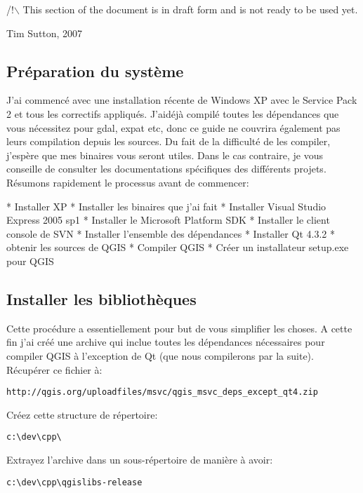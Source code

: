 /!$\backslash$ This section of the document is in draft form and is not ready to
be used yet.

Tim Sutton, 2007

\subsection{Pr\'eparation du syst\`eme}
J'ai commenc\'e avec une installation r\'ecente de Windows XP avec le Service Pack 2 et tous les correctifs appliqu\'es. J'aid\'ej\`a compil\'e toutes les d\'ependances que vous n\'ecessitez pour gdal, expat etc, donc ce guide ne couvrira \'egalement pas leurs compilation depuis les sources. Du fait de la difficult\'e de les compiler, j'esp\`ere que mes binaires vous seront utiles. Dans le cas contraire, je vous conseille de consulter les documentations sp\'ecifiques des diff\'erents projets. R\'esumons rapidement le processus avant de commencer:

 * Installer XP 
 * Installer les binaires que j'ai fait
 * Installer Visual Studio Express 2005 sp1
 * Installer le Microsoft Platform SDK
 * Installer le client console de SVN
 * Installer l'ensemble des d\'ependances
 * Installer Qt 4.3.2
 * obtenir les sources de QGIS
 * Compiler QGIS
 * Cr\'eer un installateur setup.exe pour QGIS

\subsection{Installer les biblioth\`eques}
Cette proc\'edure a essentiellement pour but de vous simplifier les choses. A cette fin j'ai cr\'e\'e une archive qui inclue  toutes les d\'ependances n\'ecessaires pour compiler QGIS \`a l'exception de Qt (que nous compilerons par la suite). R\'ecup\'erer ce fichier \`a:

\begin{verbatim}
http://qgis.org/uploadfiles/msvc/qgis_msvc_deps_except_qt4.zip
\end{verbatim}

Cr\'eez cette structure de r\'epertoire:

\begin{verbatim}
c:\dev\cpp\
\end{verbatim}

Extrayez l'archive dans un sous-r\'epertoire de mani\`ere \`a avoir:

\begin{verbatim}
c:\dev\cpp\qgislibs-release
\end{verbatim}

